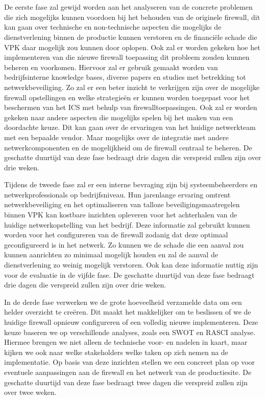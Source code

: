 \chapter{}%
\label{ch:methodologie}

De eerste fase zal gewijd worden aan het analyseren van de concrete problemen die zich mogelijks kunnen voordoen bij het behouden van de originele firewall, dit kan gaan over technische en non-technische aspecten die mogelijks de dienstverlening binnen de productie kunnen verstoren en de financiële schade die VPK daar mogelijk zou kunnen door oplopen. Ook zal er worden gekeken hoe het implementeren van die nieuwe firewall toepassing dit probleem zouden kunnen beheren en voorkomen. Hiervoor zal er gebruik gemaakt worden van bedrijfsinterne knowledge bases, diverse papers en studies met betrekking tot netwerkbeveiliging. Zo zal er een beter inzicht te verkrijgen zijn over de mogelijke firewall opstellingen en welke strategieën er kunnen worden toegepast voor het beschermen van het ICS met behulp van firewalltoepassingen. Ook zal er worden gekeken naar andere aspecten die mogelijks spelen bij het maken van een doordachte keuze. Dit kan gaan over de ervaringen van het huidige netwerkteam met een bepaalde vendor. Maar mogelijks over de integratie met andere netwerkcomponenten en de mogelijkheid om de firewall centraal te beheren. De geschatte duurtijd van deze fase bedraagt drie dagen die verspreid zullen zijn over drie weken.

Tijdens de tweede fase zal er een interne bevraging zijn bij systeembeheerders en netwerkprofessionals op bedrijfsniveau. Hun jarenlange ervaring omtrent netwerkbeveiliging en het optimaliseren van talloze beveiligingsmaatregelen binnen VPK kan kostbare inzichten opleveren voor het achterhalen van de huidige netwerkopstelling van het bedrijf. Deze informatie zal gebruikt kunnen worden voor het configureren van de firewall zodanig dat deze optimaal geconfigureerd is in het netwerk. Zo kunnen we de schade die een aanval zou kunnen aanrichten zo minimaal mogelijk houden en zal de aanval de dienstverlening zo weinig mogelijk verstoren. Ook kan deze informatie nuttig zijn voor de evaluatie in de vijfde fase. De geschatte duurtijd van deze fase bedraagt drie dagen die verspreid zullen zijn over drie weken.

In de derde fase verwerken we de grote hoeveelheid verzamelde data om een helder overzicht te creëren. Dit maakt het makkelijker om te beslissen of we de huidige firewall opnieuw configureren of een volledig nieuwe implementeren. Deze keuze baseren we op verschillende analyses, zoals een SWOT en RASCI analyse. Hiermee brengen we niet alleen de technische voor- en nadelen in kaart, maar kijken we ook naar welke stakeholders welke taken op zich nemen na de implementatie. Op basis van deze inzichten stellen we een concreet plan op voor eventuele aanpassingen aan de firewall en het netwerk van de productiesite. De geschatte duurtijd van deze fase bedraagt twee dagen die verspreid zullen zijn over twee weken.

